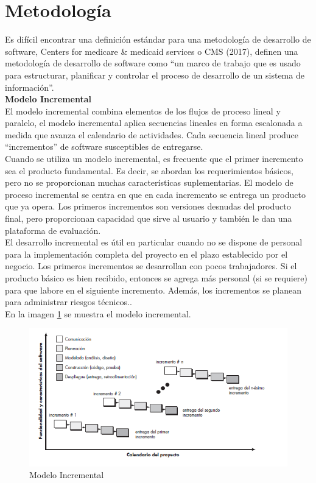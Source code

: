 \section{Metodología}
Es difícil encontrar una definición estándar para una metodología de desarrollo de software, Centers for medicare \& medicaid services o CMS (2017), definen una metodología de desarrollo de software como “un marco de trabajo que es usado para estructurar, planificar y controlar el proceso de desarrollo de un sistema de información”\cite{metodologia}.
\\
\textbf{Modelo Incremental}\\
El modelo incremental combina elementos de los flujos de proceso lineal y paralelo, el modelo incremental aplica secuencias lineales en forma escalonada a medida que avanza el calendario de actividades. Cada secuencia lineal produce “incrementos” de software susceptibles de entregarse.\\
Cuando se utiliza un modelo incremental, es frecuente que el primer incremento sea el producto fundamental. Es decir, se abordan los requerimientos básicos, pero no se proporcionan muchas características suplementarias. El modelo de proceso incremental se centra en que en cada incremento se entrega un producto que ya opera. Los primeros incrementos son versiones desnudas del producto final, pero proporcionan capacidad que sirve al usuario y también le dan una plataforma de evaluación.\\
El desarrollo incremental es útil en particular cuando no se dispone de personal para la implementación completa del proyecto en el plazo establecido por el negocio. Los primeros incrementos se desarrollan con pocos trabajadores. Si el producto básico es bien recibido, entonces
se agrega más personal (si se requiere) para que labore en el siguiente incremento. Además, los incrementos se planean para administrar riesgos técnicos.\cite{Pressman}.
\\
En la imagen \ref{fig:ModeloIncremental} se muestra el modelo incremental.
\begin{figure}[H]
	\centering
	\includegraphics[width=1\textwidth]{Capitulo3/img/ModeloIncremental}
	\caption{Modelo Incremental}
	\label{fig:ModeloIncremental}
\end{figure}

